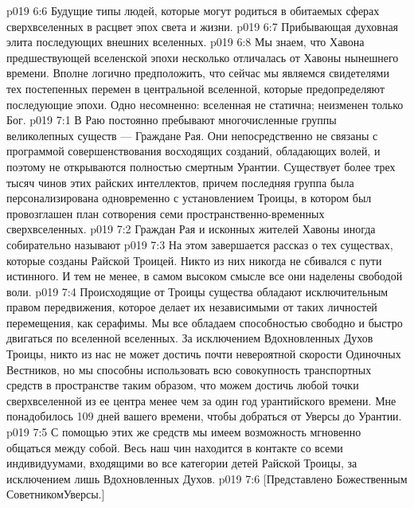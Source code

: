 \vs p019 6:6 \pc {}\bibnobreakspace Будущие типы людей, которые могут родиться в обитаемых сферах сверхвселенных в расцвет эпох света и жизни.
\vs p019 6:7 \bibnobreakspace Прибывающая духовная элита последующих внешних вселенных.
\vs p019 6:8 Мы знаем, что Хавона предшествующей вселенской эпохи несколько отличалась от Хавоны нынешнего времени. Вполне логично предположить, что сейчас мы являемся свидетелями тех постепенных перемен в центральной вселенной, которые предопределяют последующие эпохи. Одно несомненно: вселенная не статична; неизменен только Бог.
\vs p019 7:1 В Раю постоянно пребывают многочисленные группы великолепных существ --- Граждане Рая. Они непосредственно не связаны с программой совершенствования восходящих созданий, обладающих волей, и поэтому не открываются полностью смертным Урантии. Существует более трех тысяч чинов этих райских интеллектов, причем последняя группа была персонализирована одновременно с установлением Троицы, в котором был провозглашен план сотворения семи пространственно\hyp{}временных сверхвселенных.
\vs p019 7:2 \pc Граждан Рая и исконных жителей Хавоны иногда собирательно называют 
\vs p019 7:3 \pc На этом завершается рассказ о тех существах, которые созданы Райской Троицей. Никто из них никогда не сбивался с пути истинного. И тем не менее, в самом высоком смысле все они наделены свободой воли.
\vs p019 7:4 Происходящие от Троицы существа обладают исключительным правом передвижения, которое делает их независимыми от таких личностей перемещения, как серафимы. Мы все обладаем способностью свободно и быстро двигаться по вселенной вселенных. За исключением Вдохновленных Духов Троицы, никто из нас не может достичь почти невероятной скорости Одиночных Вестников, но мы способны использовать всю совокупность транспортных средств в пространстве таким образом, что можем достичь любой точки сверхвселенной из ее центра менее чем за один год урантийского времени. Мне понадобилось 109 дней вашего времени, чтобы добраться от Уверсы до Урантии.
\vs p019 7:5 С помощью этих же средств мы имеем возможность мгновенно общаться между собой. Весь наш чин находится в контакте со всеми индивидуумами, входящими во все категории детей Райской Троицы, за исключением лишь Вдохновленных Духов.
\vsetoff
\vs p019 7:6 [Представлено Божественным СоветникомУверсы.]
